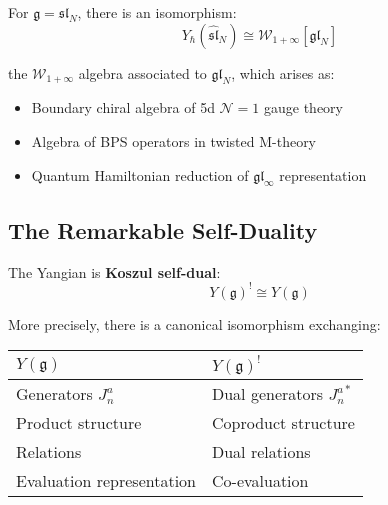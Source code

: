 \begin{theorem}
For $\mathfrak{g} = \mathfrak{sl}_N$, there is an isomorphism:
$$Y_{\hbar}(\widehat{\mathfrak{sl}}_N) \cong \mathcal{W}_{1+\infty}[\mathfrak{gl}_N]$$

the $\mathcal{W}_{1+\infty}$ algebra associated to $\mathfrak{gl}_N$, which arises as:
\begin{itemize}
\item Boundary chiral algebra of 5d $\mathcal{N}=1$ gauge theory
\item Algebra of BPS operators in twisted M-theory
\item Quantum Hamiltonian reduction of $\mathfrak{gl}_\infty$ representation
\end{itemize}
\end{theorem}

\subsection{The Remarkable Self-Duality}

\begin{theorem}\label{thm:yangian-self-dual}
The Yangian is \textbf{Koszul self-dual}:
$$Y(\mathfrak{g})^! \cong Y(\mathfrak{g})$$

More precisely, there is a canonical isomorphism exchanging:
\begin{center}
\begin{tabular}{|l|l|}
\hline
\textbf{$Y(\mathfrak{g})$} & \textbf{$Y(\mathfrak{g})^!$} \\
\hline
Generators $J^a_n$ & Dual generators $J^{a*}_n$ \\
Product structure & Coproduct structure \\
Relations & Dual relations \\
Evaluation representation & Co-evaluation \\
\hline
\end{tabular}
\end{center}
\end{theorem}

